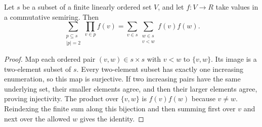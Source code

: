 \begin{lemma}
Let $s$ be a subset of a finite linearly ordered set $V$, and let
$f:V\to R$ take values in a commutative semiring. Then
\[
\sum_{\substack{p\subseteq s\\|p|=2}}\prod_{v\in p}f(v)
=\sum_{v\in s}\sum_{\substack{w\in s\\v<w}}f(v)f(w).
\]
\end{lemma}
\begin{proof}
Map each ordered pair $(v,w)\in s\times s$ with $v<w$ to $\{v,w\}$.
Its image is a two-element subset of $s$. Every two-element subset has
exactly one increasing enumeration, so this map is surjective. If two
increasing pairs have the same underlying set, their smaller elements
agree, and then their larger elements agree, proving injectivity.
The product over $\{v,w\}$ is $f(v)f(w)$ because $v\ne w$.
Reindexing the finite sum along this bijection and then summing first over
$v$ and next over the allowed $w$ gives the identity.
\end{proof}
